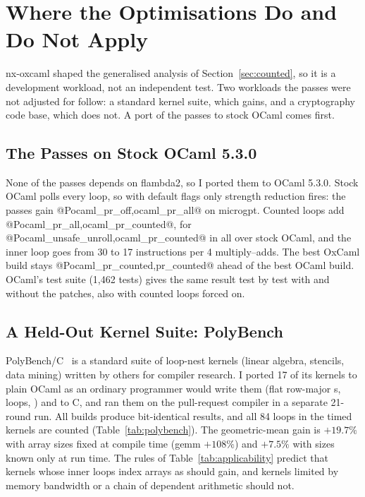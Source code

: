 \section{Where the Optimisations Do and Do Not Apply}
\label{sec:generality}

nx-oxcaml shaped the generalised analysis of Section~\ref{sec:counted}, so it
is a development workload, not an independent test. Two workloads the passes
were not adjusted for follow: a standard kernel suite, which gains, and a
cryptography code base, which does not. A port of the passes to stock OCaml
comes first.

\subsection{The Passes on Stock OCaml 5.3.0}
\label{sec:stock}
None of the passes depends on flambda2, so I ported them to OCaml 5.3.0.
Stock OCaml polls every loop, so with default flags only strength reduction
fires: the passes gain @P{ocaml_pr_off,ocaml_pr_all}@ on microgpt. Counted
loops add @P{ocaml_pr_all,ocaml_pr_counted}@, for
@P{ocaml_unsafe_unroll,ocaml_pr_counted}@ in all over stock OCaml, and the
inner loop goes from 30 to 17 instructions per 4 multiply--adds. The best OxCaml build stays @P{ocaml_pr_counted,pr_counted}@
ahead of the best OCaml build. OCaml's test suite (1,462 tests) gives the same
result test by test with and without the patches, also with counted loops
forced on.

\subsection{A Held-Out Kernel Suite: PolyBench}
\label{sec:polybench}
PolyBench/C~\cite{polybench} is a standard suite of loop-nest kernels
(linear algebra, stencils, data mining) written by others for compiler
research. I ported 17 of its kernels to plain OCaml as an ordinary programmer
would write them (flat row-major s,  loops,
) and to C, and ran them on the pull-request compiler in a
separate 21-round run. All builds produce bit-identical results, and all
84 loops in the timed kernels are counted (Table~\ref{tab:polybench}). The
geometric-mean gain is $+19.7\%$ with array sizes fixed at compile time
(gemm $+108\%$) and $+7.5\%$ with sizes known only at run time. The
rules of Table~\ref{tab:applicability} predict that kernels whose inner loops
index arrays as  should gain, and kernels limited by
memory bandwidth or a chain of dependent arithmetic should not.

